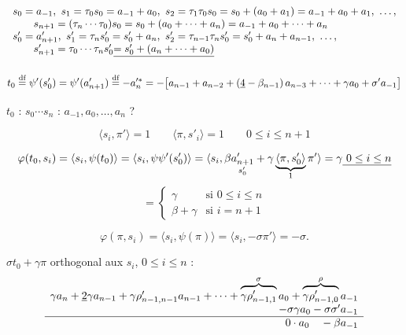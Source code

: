 \documentclass[11pt,a4paper]{article}
\begin{document}
\[
\begin{array}{l}
s_0 = a_{-1},\ s_1 = \tau_0 s_0 = a_{-1} + a_0,\ s_2 = \tau_1\tau_0 s_0 = s_0 + (a_0 + a_1) = a_{-1} + a_0 + a_1,\ \ldots,\\
\qquad s_{n+1} = (\tau_n \cdots \tau_0) s_0 = s_0 + (a_0 + \cdots + a_n) = a_{-1} + a_0 + \cdots + a_n \\
s'_0 = a'_{n+1},\ s'_1 = \tau_n s'_0 = s'_0 + a_n,\ s'_2 = \tau_{n-1}\tau_n s'_0 = s'_0 + a_n + a_{n-1},\ \ldots,\\
\qquad s'_{n+1} = \tau_0 \cdots \tau_n s'_0 \struck{= s'_0 + (a_n + \cdots + a_0)}
\end{array}
\]

\[
t_0 \overset{\text{df}}{=} \psi'(s'_0) = \psi'(a'_{n+1}) \overset{\text{df}}{=} -a'^{*}_n
= -\bigl[ a_{n-1} + a_{n-2} + (\uncertain{4} - \beta_{n-1})\, a_{n-3} + \cdots + \gamma a_0 + \sigma' a_{-1} \bigr]
\]

$t_0$ \ill{} : $s_0 \cdots s_n$ \ill{} : $a_{-1}, a_0, \ldots, a_n$ ?

\[
\boxed{\langle s_i, \pi' \rangle = 1 \qquad \langle \pi, s'_i \rangle = 1 \qquad 0 \leq i \leq n+1}
\]

\[
\varphi(t_0, s_i) = \langle s_i, \psi(t_0) \rangle = \langle s_i, \psi\psi'(s'_0) \rangle
= \langle s_i, \beta \underset{s'_0}{a'_{n+1}} + \gamma \underbrace{\langle \pi, s'_0 \rangle}_{1} \pi' \rangle
= \gamma \struck{\ 0 \leq i \leq n}
\]
\[
= \begin{cases} \gamma & \text{si } 0 \leq i \leq n \\ \beta + \gamma & \text{si } i = n+1 \end{cases}
\]

\[
\varphi(\pi, s_i) = \langle s_i, \psi(\pi) \rangle = \langle s_i, -\sigma\pi' \rangle = -\sigma.
\]

$\sigma t_0 + \gamma\pi$ orthogonal aux $s_i$, $0 \leq i \leq n$ :
\[
\begin{array}{r}
\gamma a_n + \uncertain{2}\gamma a_{n-1} + \gamma\rho'_{n-1,n-1} a_{n-1} + \cdots + \overbrace{\gamma\rho'_{n-1,1}}^{\sigma} a_0 + \overbrace{\gamma\rho'_{n-1,0}}^{\rho} a_{-1} \\
- \sigma\gamma a_0 - \sigma\sigma' a_{-1} \\
\hline
0 \cdot a_0 \quad - \beta a_{-1}
\end{array}
\]
\end{document}
